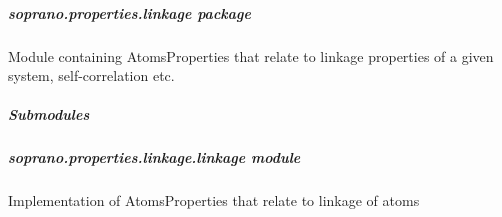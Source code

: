\documentclass[letterpaper,10pt,english]{sphinxmanual}
\begin{document}
\begin{fulllineitems}

\begin{fulllineitems}
\label{doctree/soprano.properties.labeling.labeling:soprano.properties.labeling.labeling.MoleculeSites.default_params}
\end{fulllineitems}


\begin{fulllineitems}
\label{doctree/soprano.properties.labeling.labeling:soprano.properties.labeling.labeling.MoleculeSites.extract}
\end{fulllineitems}


\end{fulllineitems}



\subparagraph{soprano.properties.linkage package}
\label{doctree/soprano.properties.linkage::doc}\label{doctree/soprano.properties.linkage:soprano-properties-linkage-package}\label{doctree/soprano.properties.linkage:module-soprano.properties.linkage}
Module containing AtomsProperties that relate to linkage properties of a given
system, self-correlation etc.


\subparagraph{Submodules}
\label{doctree/soprano.properties.linkage:submodules}

\subparagraph{soprano.properties.linkage.linkage module}
\label{doctree/soprano.properties.linkage.linkage::doc}\label{doctree/soprano.properties.linkage.linkage:module-soprano.properties.linkage.linkage}\label{doctree/soprano.properties.linkage.linkage:soprano-properties-linkage-linkage-module}
Implementation of AtomsProperties that relate to linkage of atoms
\end{document}

